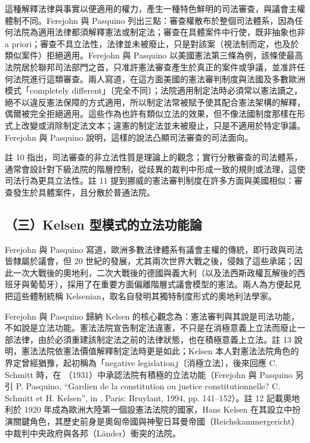 這種解釋法律與事實以便適用的權力，產生一種特色鮮明的司法審查，與議會主權體制不同。Ferejohn 與 Pasquino 列出三點：審查權散布於整個司法體系，因為任何法院為適用法律都須解釋憲法或制定法；審查在具體案件中行使，既非抽象也非 a priori；審查不具立法性，法律並未被廢止，只是對該案（視法制而定，也及於類似案件）拒絕適用。Ferejohn 與 Pasquino 以美國憲法第三條為例，該條使最高法院居於聯邦司法部門之首，只准許憲法審查產生於真正的案件或爭議，並准許任何法院進行這類審查。兩人寫道，在這方面美國的憲法審判制度與法國及多數歐洲模式「completely different」〔完全不同〕；法院適用制定法時必須常以憲法讀之，絕不以違反憲法保障的方式適用，所以制定法常被賦予使其配合憲法架構的解釋，偶爾被完全拒絕適用。這些作為也許有類似立法的效果，但不像法國制度那樣在形式上改變或消除制定法文本；違憲的制定法並未被廢止，只是不適用於特定爭議。Ferejohn 與 Pasquino 說明，這樣的說法凸顯司法審查的司法面向。

註 10 指出，司法審查的非立法性質是理論上的觀念；實行分散審查的司法體系，通常會設計對下級法院的階層控制，從歧異的裁判中形成一致的規則或法理，這使司法行為更具立法性。註 11 提到挪威的憲法審判制度在許多方面與美國相似：審查發生於具體案件，且分散於普通法院。

\subsection{（三）Kelsen 型模式的立法功能論}

Ferejohn 與 Pasquino 寫道，歐洲多數法律體系有議會主權的傳統，即行政與司法皆隸屬於議會，但 20 世紀的發展，尤其兩次世界大戰之後，侵蝕了這些承諾；因此一次大戰後的奧地利，二次大戰後的德國與義大利（以及法西斯政權瓦解後的西班牙與葡萄牙），採用了在重要方面偏離階層式議會模型的憲法。兩人為方便起見把這些體制統稱 Kelsenian，取名自發明其獨特制度形式的奧地利法學家。

Ferejohn 與 Pasquino 歸納 Kelsen 的核心觀念為：憲法審判與其說是司法功能，不如說是立法功能。憲法法院宣告制定法違憲，不只是在消極意義上立法而廢止一部法律，由於必須重建該制定法之前的法律狀態，也在積極意義上立法。註 13 說明，憲法法院依憲法價值解釋制定法時更是如此；Kelsen 本人對憲法法院角色的界定曾經猶豫，起初稱為「negative legislation」〔消極立法〕，後來回應 C. Schmitt 時，在 （1931）中承認法院有積極的立法功能（Ferejohn 與 Pasquino 另引 P. Pasquino, ``Gardien de la constitution ou justice constitutionnelle? C. Schmitt et H. Kelsen'', in , Paris: Bruylant, 1994, pp. 141--152）。註 12 記載奧地利於 1920 年成為歐洲大陸第一個設憲法法院的國家，Hans Kelsen 在其設立中扮演關鍵角色，其歷史前身是奧匈帝國與神聖日耳曼帝國（Reichskammergericht）中裁判中央政府與各邦（Länder）衝突的法院。

